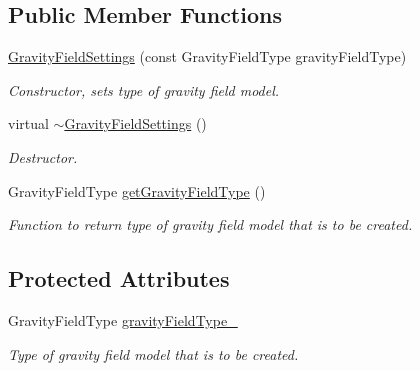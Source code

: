 \subsection*{Public Member Functions}
\begin{DoxyCompactItemize}
\item 
\hyperlink{classtudat_1_1simulation__setup_1_1GravityFieldSettings_a410bdae779dd436f713d4116b64a0601}{Gravity\+Field\+Settings} (const Gravity\+Field\+Type gravity\+Field\+Type)
\begin{DoxyCompactList}\small\item\em Constructor, sets type of gravity field model. \end{DoxyCompactList}\item 
virtual \hyperlink{classtudat_1_1simulation__setup_1_1GravityFieldSettings_a1c09b45caa37db3c2e17ebf1fac98d7c}{$\sim$\+Gravity\+Field\+Settings} ()\hypertarget{classtudat_1_1simulation__setup_1_1GravityFieldSettings_a1c09b45caa37db3c2e17ebf1fac98d7c}{}\label{classtudat_1_1simulation__setup_1_1GravityFieldSettings_a1c09b45caa37db3c2e17ebf1fac98d7c}

\begin{DoxyCompactList}\small\item\em Destructor. \end{DoxyCompactList}\item 
Gravity\+Field\+Type \hyperlink{classtudat_1_1simulation__setup_1_1GravityFieldSettings_a186ea91c0ece0951f21ec4280f277f71}{get\+Gravity\+Field\+Type} ()
\begin{DoxyCompactList}\small\item\em Function to return type of gravity field model that is to be created. \end{DoxyCompactList}\end{DoxyCompactItemize}
\subsection*{Protected Attributes}
\begin{DoxyCompactItemize}
\item 
Gravity\+Field\+Type \hyperlink{classtudat_1_1simulation__setup_1_1GravityFieldSettings_ab9d4396fbf0b4c66710b78eb14928056}{gravity\+Field\+Type\+\_\+}\hypertarget{classtudat_1_1simulation__setup_1_1GravityFieldSettings_ab9d4396fbf0b4c66710b78eb14928056}{}\label{classtudat_1_1simulation__setup_1_1GravityFieldSettings_ab9d4396fbf0b4c66710b78eb14928056}

\begin{DoxyCompactList}\small\item\em Type of gravity field model that is to be created. \end{DoxyCompactList}\end{DoxyCompactItemize}


